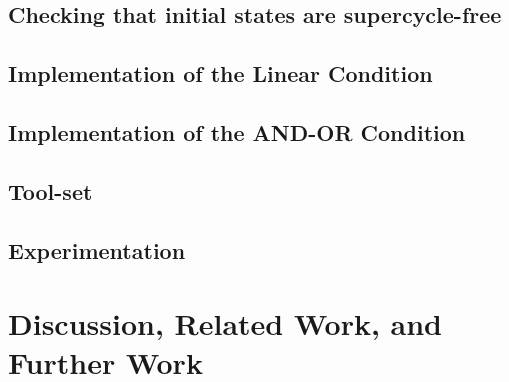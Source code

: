 \documentclass[prodmode,acmtosem]{acmsmall} %
\begin{document}
   \subsection{Checking that initial states are supercycle-free}
   \label{s:initSCFree}
   

   \subsection{Implementation of the Linear Condition}
   \label{s:implLin}
   
   
   \subsection{Implementation of the AND-OR Condition}
   \label{s:implANDOR}
   

   \subsection{Tool-set}
   \label{s:tools}
   

   \subsection{Experimentation}
   \label{s:experiments}
   

\section{Discussion, Related Work, and Further Work}
\label{s:discussion}








%
\end{document}
